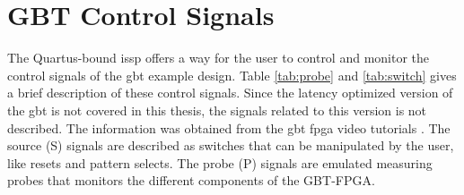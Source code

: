 \documentclass[main.tex]{subfiles}
\begin{document}
\chapter{GBT Control Signals} \label{ap:gbtctrl}

The Quartus-bound \gls{issp} offers a way for the user to control and monitor the control signals of the \gls{gbt} example design. Table \ref{tab:probe} and \ref{tab:switch} gives a brief description of these control signals. Since the latency optimized version of the \gls{gbt} is not covered in this thesis, the signals related to this version is not described. The information was obtained from the \gls{gbt} \gls{fpga} video tutorials \cite{gbt_videos}. The source (S) signals are described as switches that can be manipulated by the user, like resets and pattern selects. The probe (P) signals are emulated measuring probes that monitors the different components of the GBT-FPGA.
\end{document}
